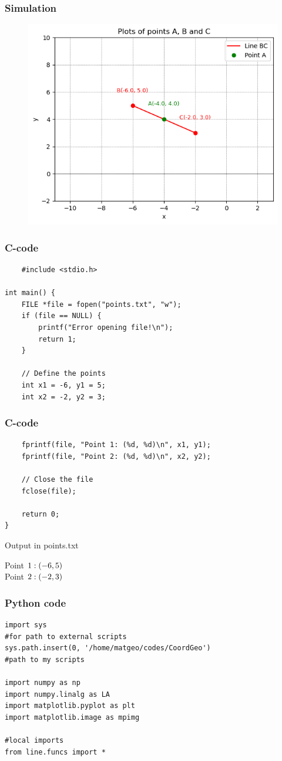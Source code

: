 \documentclass{beamer}
\begin{document}
\begin{frame}
\frametitle{Simulation}
\begin{figure}
    \centering
    \includegraphics[width=0.7\linewidth]{plot.png}
\end{figure}
\end{frame}
\begin{frame}[fragile]
\frametitle{C-code}
\begin{verbatim}
    #include <stdio.h>

int main() {
    FILE *file = fopen("points.txt", "w");
    if (file == NULL) {
        printf("Error opening file!\n");
        return 1;
    }

    // Define the points
    int x1 = -6, y1 = 5;
    int x2 = -2, y2 = 3;
 \end{verbatim}   
 \end{frame}
 \begin{frame}[fragile]
 \frametitle{C-code}
   \begin{verbatim}  
    fprintf(file, "Point 1: (%d, %d)\n", x1, y1);
    fprintf(file, "Point 2: (%d, %d)\n", x2, y2);

    // Close the file
    fclose(file);

    return 0;
}
\end{verbatim}
\end{frame}
\begin{frame}{Output in points.txt}
\begin{center}
    Point \quad$1: \left(-6, 5\right)$\\
    Point \quad$2: \left(-2, 3\right)$
\end{center}
\end{frame}
\begin{frame}[fragile]
\frametitle{Python code}
    \begin{verbatim}
import sys               
#for path to external scripts
sys.path.insert(0, '/home/matgeo/codes/CoordGeo')
#path to my scripts

import numpy as np
import numpy.linalg as LA
import matplotlib.pyplot as plt
import matplotlib.image as mpimg

#local imports
from line.funcs import *
\end{verbatim}
\end{frame}
\end{document}
